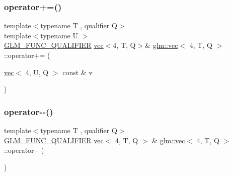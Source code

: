 \subsubsection{\texorpdfstring{operator+=()}{operator+=()}\hspace{0.1cm}{\footnotesize\ttfamily [6/6]}}
{\footnotesize\ttfamily template$<$typename T , qualifier Q$>$ \\
template$<$typename U $>$ \\
\hyperlink{setup_8hpp_a33fdea6f91c5f834105f7415e2a64407}{G\+L\+M\+\_\+\+F\+U\+N\+C\+\_\+\+Q\+U\+A\+L\+I\+F\+I\+ER} \hyperlink{structglm_1_1vec}{vec}$<$4, T, Q$>$\& \hyperlink{structglm_1_1vec}{glm\+::vec}$<$ 4, T, Q $>$\+::operator+= (\begin{DoxyParamCaption}\item[{\hyperlink{structglm_1_1vec}{vec}$<$ 4, U, Q $>$ const \&}]{v }\end{DoxyParamCaption})}

\mbox{\label{structglm_1_1vec_3_014_00_01_t_00_01_q_01_4_a1aa18c4fcac90cabb4f8cb2e467d4d9f}} 
\subsubsection{\texorpdfstring{operator-\/-\/()}{operator--()}\hspace{0.1cm}{\footnotesize\ttfamily [1/2]}}
{\footnotesize\ttfamily template$<$typename T , qualifier Q$>$ \\
\hyperlink{setup_8hpp_a33fdea6f91c5f834105f7415e2a64407}{G\+L\+M\+\_\+\+F\+U\+N\+C\+\_\+\+Q\+U\+A\+L\+I\+F\+I\+ER} \hyperlink{structglm_1_1vec}{vec}$<$ 4, T, Q $>$ \& \hyperlink{structglm_1_1vec}{glm\+::vec}$<$ 4, T, Q $>$\+::operator-\/-\/ (\begin{DoxyParamCaption}{ }\end{DoxyParamCaption})}

\mbox{\label{structglm_1_1vec_3_014_00_01_t_00_01_q_01_4_ae095dbcd5c299033774aef2f534e9a26}} 

